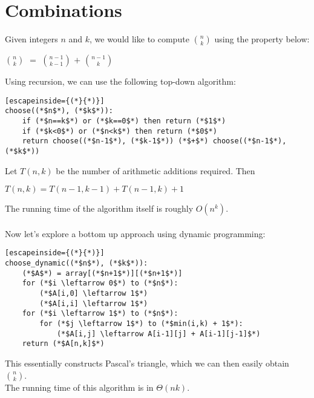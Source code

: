 \documentclass[a4paper]{article}
\begin{document}
\section{Combinations}
Given integers $n$ and $k$, we would like to compute $n\choose k$ using the property below:
\begin{center}
	$n\choose k$ $=$ $n-1\choose k-1$ $+$ $n-1\choose k$ 
\end{center}
Using recursion, we can use the following top-down algorithm:
\begin{lstlisting}[escapeinside={(*}{*)}]
choose((*$n$*), (*$k$*)):
	if (*$n==k$*) or (*$k==0$*) then return (*$1$*)
	if (*$k<0$*) or (*$n<k$*) then return (*$0$*)
	return choose((*$n-1$*), (*$k-1$*)) (*$+$*) choose((*$n-1$*), (*$k$*))
\end{lstlisting}
Let $T(n, k)$ be the number of arithmetic additions required. Then
\begin{center}
	$T(n,k) = T(n-1, k-1) + T(n-1,k) + 1$
\end{center}
The running time of the algorithm itself is roughly $O(n^k)$.\\ \\
Now let's explore a bottom up approach using dynamic programming:
\begin{lstlisting}[escapeinside={(*}{*)}]
choose_dynamic((*$n$*), (*$k$*)):
	(*$A$*) = array[(*$n+1$*)][(*$n+1$*)]
	for (*$i \leftarrow 0$*) to (*$n$*):
		(*$A[i,0] \leftarrow 1$*)
		(*$A[i,i] \leftarrow 1$*)
	for (*$i \leftarrow 1$*) to (*$n$*):
		for (*$j \leftarrow 1$*) to (*$min(i,k) + 1$*):
			(*$A[i,j] \leftarrow A[i-1][j] + A[i-1][j-1]$*)
	return (*$A[n,k]$*)
\end{lstlisting}
This essentially constructs Pascal's triangle, which we can then easily obtain $n\choose k$.\\
The running time of this algorithm is in $\Theta(nk)$.
\end{document}
